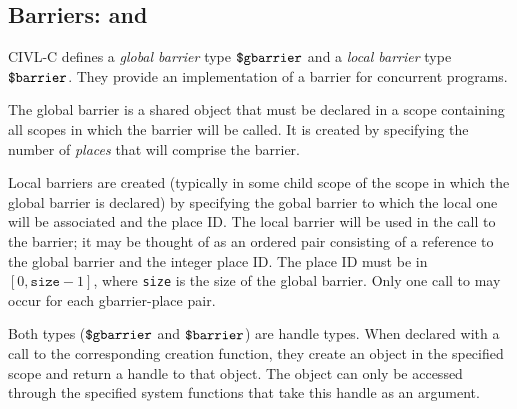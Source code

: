 \subsection{Barriers: \cgbarrier{} and \cbarrier}
\label{sec:barriers}

CIVL-C defines a \emph{global barrier} type $\mbox{\texttt{\${}gbarrier}}$ and a
\emph{local barrier} type $\mbox{\texttt{\${}barrier}}$. They provide an implementation of 
a barrier for concurrent programs.

The global barrier is a shared object that must be declared in
a scope containing all scopes in which the barrier will be called.
 It is created by specifying the number of
\emph{places} that will comprise the barrier. 

Local barriers are created (typically in some child scope of the
scope in which the global barrier is declared) by specifying the
gobal barrier to which the local one will be associated and the
place ID. The local barrier will be used in the call to the barrier; 
it may be thought of as an ordered pair
consisting of a reference to the global barrier and the integer
place ID.  The place ID must be in $[0,\texttt{size}-1]$, where
\texttt{size} is the size of the global barrier.    
Only one call to \cbarriercreate{}
may occur for each gbarrier-place pair.


Both types ($\mbox{\texttt{\${}gbarrier}}$ and $\mbox{\texttt{\${}barrier}}$) are handle types. When declared
with a call to the corresponding creation function, they create an
object in the specified scope and return a handle to that object. The
object can only be accessed through the specified system functions
that take this handle as an argument.


